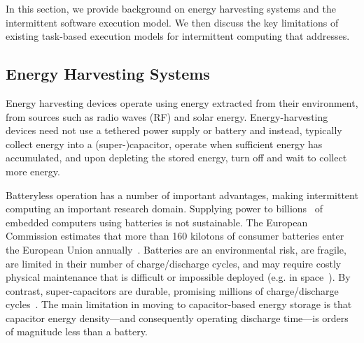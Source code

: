 In this section, we provide background on energy harvesting systems and the intermittent software execution model. We then discuss the key limitations of existing task-based execution models for intermittent computing that \sys
addresses.

\subsection{Energy Harvesting Systems}
\label{sec:background_harvesting}

Energy harvesting devices operate using energy extracted from their environment, from sources such as radio waves (RF) and solar energy. Energy-harvesting devices need not use a tethered power supply or battery and instead, typically collect energy into a (super-)capacitor, operate when sufficient energy has accumulated, and upon depleting the stored energy, turn off and wait to collect more energy.

Batteryless operation has a number of important advantages, making intermittent computing an important research domain. Supplying power to billions~\cite{gartner_iot} of embedded computers using batteries is not sustainable. The European Commission estimates that more than 160 kilotons of consumer batteries enter the European Union annually~\cite{eu_batteries_2016}. Batteries are an environmental risk, are fragile, are limited in their number of charge/discharge cycles, and may require costly physical maintenance that is difficult or impossible deployed (e.g. in space~\cite{kicksat}). By contrast, super-capacitors are durable, promising millions of charge/discharge cycles~\cite[Sec. I]{ongaro_pwre_2012}. The main limitation in moving to capacitor-based energy storage is that capacitor energy density---and consequently operating discharge time---is orders of magnitude less than a battery. 


